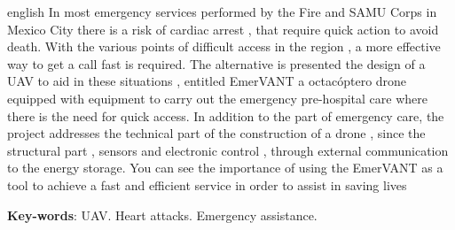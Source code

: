 \begin{resumo}[Abstract]
 \begin{otherlanguage*}{english}
  In most emergency services performed by the Fire and SAMU Corps in Mexico City there is a risk of cardiac arrest ,
that require quick action to avoid death. With the various points of difficult access in the region , a more effective way to get a call
fast is required. The alternative is presented the design of a UAV to aid in these situations , entitled EmerVANT a octacóptero drone
equipped with equipment to carry out the emergency pre-hospital care where there is the need for quick access. In addition to the part of emergency care,
the project addresses the technical part of the construction of a drone , since the structural part , sensors and electronic control , through external communication to the
energy storage. You can see the importance of using the EmerVANT as a tool to achieve a fast and efficient service in order to
assist in saving lives 

   \vspace{\onelineskip}
 
   \noindent 
   \textbf{Key-words}: UAV. Heart attacks. Emergency assistance.
 \end{otherlanguage*}
\end{resumo}
